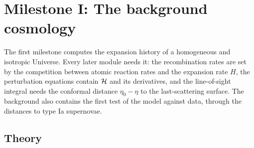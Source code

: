 \section{Milestone I: The background cosmology}\label{sec:m1}

The first milestone computes the expansion history of a homogeneous and isotropic Universe. Every later module
needs it: the recombination rates are set by the competition between atomic reaction rates and the expansion rate
$H$, the perturbation equations contain $\mathcal{H}$ and its derivatives, and the line-of-sight integral needs the conformal
distance $\eta_0-\eta$ to the last-scattering surface. The background also contains the first test of the model
against data, through the distances to type Ia supernovae.

\subsection{Theory}

